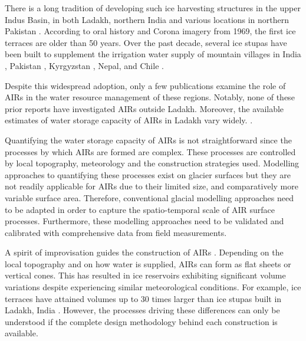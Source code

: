 There is a long tradition of developing such ice harvesting structures in the upper Indus Basin, in both Ladakh,
northern India \citep{labbalTraditionalOasesLadakh2000, nusserIrrigationDevelopmentUpper2012} and various
locations in northern Pakistan \citep{kreutzmannScarcityOpulenceWater2011}. According to oral history and Corona
imagery from 1969, the first ice terraces are older than 50 years. Over the past decade, several ice stupas have
been built to supplement the irrigation water supply of mountain villages in India
\citep{wangchukIceStupaCompetition2020, palmerStoringFrozenWater2022, aggarwalAdaptationClimateChange2021},
Pakistan \citep{awazproductionIceStupaArtificial2022}, Kyrgyzstan \citep{bbcnewsBrightArtificialGlacier2020},
Nepal, and Chile \citep{reutersConservationistsChileAim2021}.

Despite this widespread adoption, only a few publications examine the role of \ac{AIRs} in the water resource
management of these regions. Notably, none of these prior reports have investigated \ac{AIRs} outside Ladakh.
Moreover, the available estimates of water storage capacity of \ac{AIRs} in Ladakh vary widely.
\citep{norphelSnowWaterHarvesting2015, baglaArtificialGlaciersHelp1998}.

Quantifying the water storage capacity of \ac{AIRs} is not straightforward since the processes by which \ac{AIRs} are
formed are complex. These processes are controlled by local topography, meteorology and the construction
strategies used. Modelling approaches to quantifying these processes exist on glacier surfaces but they are not
readily applicable for \ac{AIRs} due to their limited size, and comparatively more variable surface area. Therefore,
conventional glacial modelling approaches need to be adapted in order to capture the
spatio-temporal scale of AIR surface processes. Furthermore, these modelling approaches need to be validated and
calibrated with comprehensive data from field measurements. 

A spirit of improvisation guides the construction of \ac{AIRs} \citep{clouseLadakhArtificialGlaciers2017}.
Depending on the local topography and on how water is supplied, \ac{AIRs} can form as flat sheets
or vertical cones. This has resulted in ice reservoirs exhibiting significant volume variations despite
experiencing similar meteorological conditions. For example, ice terraces have attained volumes up to 30 times
larger than ice stupas built in Ladakh, India \citep{nusserSociohydrologyArtificialGlaciers2019}. However, the
processes driving these differences can only be understood if the complete design methodology behind each construction is available.

